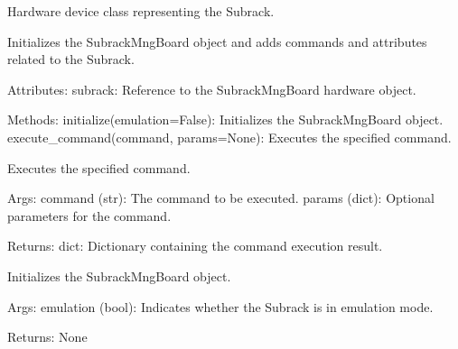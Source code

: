 \documentclass[letterpaper,10pt,english]{sphinxmanual}
\begin{document}
\begin{fulllineitems}
\label{\detokenize{webserverdocs:subrack_hardware.SubrackHardware}}
\pysigstartsignatures
{}
\pysigstopsignatures
\sphinxAtStartPar
Hardware device class representing the Subrack.

\sphinxAtStartPar
Initializes the SubrackMngBoard object and adds commands and attributes related to the Subrack.

\sphinxAtStartPar
Attributes:
\sphinxhyphen{} subrack: Reference to the SubrackMngBoard hardware object.

\sphinxAtStartPar
Methods:
\sphinxhyphen{} initialize(emulation=False): Initializes the SubrackMngBoard object.
\sphinxhyphen{} execute\_command(command, params=None): Executes the specified command.

\begin{fulllineitems}
\label{\detokenize{webserverdocs:subrack_hardware.SubrackHardware.execute_command}}
\pysigstartsignatures
{}
\pysigstopsignatures
\sphinxAtStartPar
Executes the specified command.

\sphinxAtStartPar
Args:
\sphinxhyphen{} command (str): The command to be executed.
\sphinxhyphen{} params (dict): Optional parameters for the command.

\sphinxAtStartPar
Returns:
dict: Dictionary containing the command execution result.

\end{fulllineitems}


\begin{fulllineitems}
\label{\detokenize{webserverdocs:subrack_hardware.SubrackHardware.initialize}}
\pysigstartsignatures
{}
\pysigstopsignatures
\sphinxAtStartPar
Initializes the SubrackMngBoard object.

\sphinxAtStartPar
Args:
\sphinxhyphen{} emulation (bool): Indicates whether the Subrack is in emulation mode.

\sphinxAtStartPar
Returns:
None

\end{fulllineitems}


\end{fulllineitems}
\end{document}
